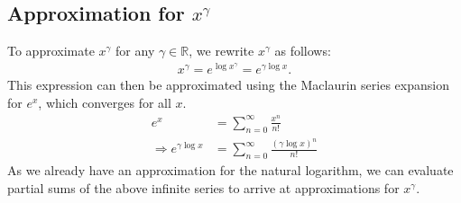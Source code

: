 \subsection{Approximation for $x^\gamma$}
To approximate $x^\gamma$ for any $\gamma \in \mathbb{R}$, we rewrite $x^\gamma$ as follows:
\begin{align*}
  x^\gamma = e^{\log{x^\gamma}} = e^{\gamma\log{x}}.
\end{align*}
This expression can then be approximated using the Maclaurin series expansion for $e^x$, which converges for all $x$.
\begin{align*}
  e^x &= \sum_{n=0}^{\infty}{\frac{x^n}{n!}}\\
  \Rightarrow e^{\gamma\log{x}} &= \sum_{n=0}^{\infty}{\frac{(\gamma\log{x})^n}{n!}}
\end{align*}
As we already have an approximation for the natural logarithm, we can evaluate partial sums of the above infinite series to arrive at approximations for $x^\gamma$.